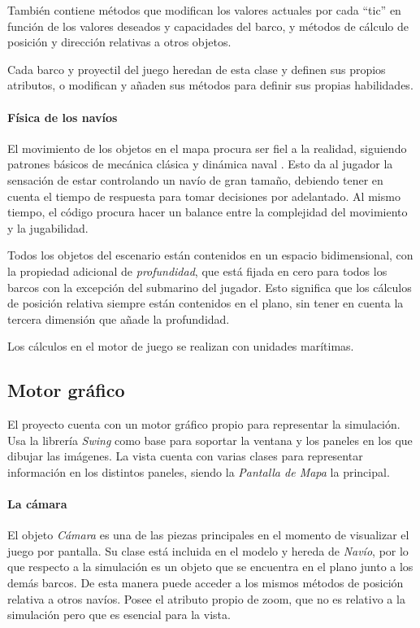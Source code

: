 \documentclass[a4paper,
	11pt,
	parskip=full,
	bibliography=totoc,
	twoside
	]{scrartcl}
\begin{document}
			También contiene métodos que modifican los valores actuales por cada ``tic'' en función de los valores deseados y capacidades del barco, y métodos de cálculo de posición y dirección relativas a otros objetos.
			
			Cada barco y proyectil del juego heredan de esta clase y definen sus propios atributos, o modifican y añaden sus métodos para definir sus propias habilidades.
			
		\paragraph{Física de los navíos}
			El movimiento de los objetos en el mapa procura ser fiel a la realidad, siguiendo patrones básicos de mecánica clásica y dinámica naval \cite{marine_insight, discover_boating, ships_business}. Esto da al jugador la sensación de estar controlando un navío de gran tamaño, debiendo tener en cuenta el tiempo de respuesta para tomar decisiones por adelantado. Al mismo tiempo, el código procura hacer un balance entre la complejidad del movimiento y la jugabilidad.
			
			Todos los objetos del escenario están contenidos en un espacio bidimensional, con la propiedad adicional de \textit{profundidad}, que está fijada en cero para todos los barcos con la excepción del submarino del jugador. Esto significa que los cálculos de posición relativa siempre están contenidos en el plano, sin tener en cuenta la tercera dimensión que añade la profundidad.
			
			Los cálculos en el motor de juego se realizan con unidades marítimas.
	
	\subsection{Motor gráfico}
	\label{subsec:motor_grafico}
		El proyecto cuenta con un motor gráfico propio para representar la simulación. Usa la librería \textit{Swing} como base para soportar la ventana y los paneles en los que dibujar las imágenes. La vista cuenta con varias clases para representar información en los distintos paneles, siendo la \textit{Pantalla de Mapa} la principal. \cite{techrepublic_java2d, so_resource_stream, so_rendering}
		
		\paragraph{La cámara}
			El objeto \textit{Cámara} es una de las piezas principales en el momento de visualizar el juego por pantalla. Su clase está incluida en el modelo y hereda de \textit{Navío}, por lo que respecto a la simulación es un objeto que se encuentra en el plano junto a los demás barcos. De esta manera puede acceder a los mismos métodos de posición relativa a otros navíos. Posee el atributo propio de zoom, que no es relativo a la simulación pero que es esencial para la vista.
			
\end{document}
